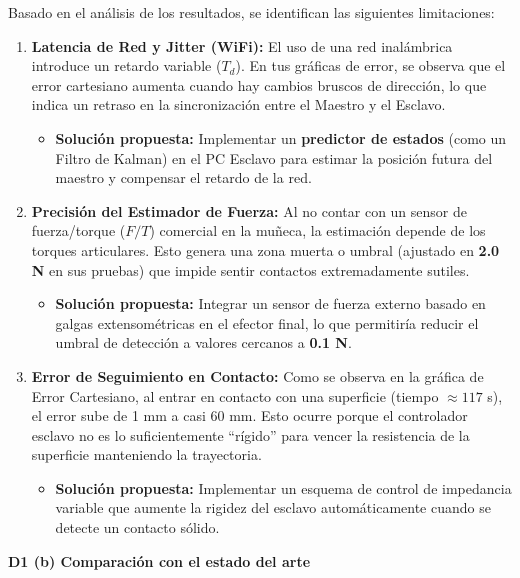 \documentclass[journal,10pt,twoside]{IEEEtran}
\begin{document}
Basado en el análisis de los resultados, se identifican las siguientes limitaciones:
\begin{enumerate}
  \item \textbf{Latencia de Red y Jitter (WiFi):} El uso de una red inalámbrica introduce un retardo variable ($T_d$). En tus gráficas de error, se observa que el error cartesiano aumenta cuando hay cambios bruscos de dirección, lo que indica un retraso en la sincronización entre el Maestro y el Esclavo.
  \begin{itemize}
    \item \textbf{Solución propuesta:} Implementar un \textbf{predictor de estados} (como un Filtro de Kalman) en el PC Esclavo para estimar la posición futura del maestro y compensar el retardo de la red.
  \end{itemize}

  \item \textbf{Precisión del Estimador de Fuerza:} Al no contar con un sensor de fuerza/torque ($F/T$) comercial en la muñeca, la estimación depende de los torques articulares. Esto genera una zona muerta o umbral (ajustado en \textbf{2.0 N} en sus pruebas) que impide sentir contactos extremadamente sutiles.
  \begin{itemize}
    \item \textbf{Solución propuesta:} Integrar un sensor de fuerza externo basado en galgas extensométricas en el efector final, lo que permitiría reducir el umbral de detección a valores cercanos a \textbf{0.1 N}.
  \end{itemize}

  \item \textbf{Error de Seguimiento en Contacto:} Como se observa en la gráfica de Error Cartesiano, al entrar en contacto con una superficie (tiempo $\approx 117$ s), el error sube de 1 mm a casi 60 mm. Esto ocurre porque el controlador esclavo no es lo suficientemente ``rígido'' para vencer la resistencia de la superficie manteniendo la trayectoria.
  \begin{itemize}
    \item \textbf{Solución propuesta:} Implementar un esquema de control de impedancia variable que aumente la rigidez del esclavo automáticamente cuando se detecte un contacto sólido.
  \end{itemize}
\end{enumerate}

\textbf{D1 (b) Comparación con el estado del arte}
\end{document}
